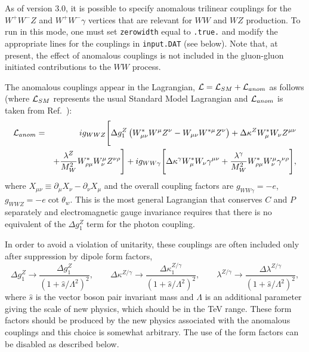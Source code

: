 \documentclass[12pt]{article}
\begin{document}
\label{sec:anomalous}
As of version 3.0, it is possible to specify anomalous trilinear
couplings for the $W^+W^-Z$ and $W^+W^-\gamma$ vertices that are
relevant for $WW$ and $WZ$ production. To run in this mode, one
must set {\tt zerowidth} equal to {\tt .true.}
and modify the appropriate lines for the couplings in {\tt input.DAT}
(see below). Note that, at present, the effect of anomalous couplings is not included
in the gluon-gluon initiated contributions to the $WW$ process.

The anomalous couplings appear in the Lagrangian,
${\cal L} = {\cal L}_{SM} + {\cal L}_{anom}$ as follows
(where ${\cal L}_{SM}$ represents the usual Standard Model Lagrangian and
${\cal L}_{anom}$ is taken from Ref.~\cite{Dixon:1999di}):
\begin{eqnarray}
{\cal L}_{anom} & = & i g_{WWZ} \Biggl[
 \Delta g_1^Z \left( W^*_{\mu\nu}W^\mu Z^\nu - W_{\mu\nu}W^{*\mu} Z^\nu \right)
+\Delta\kappa^Z W^*_\mu W_\nu Z^{\mu\nu} \nonumber \\
 & &+
 \frac{\lambda^Z}{M_W^2} W^*_{\rho\mu} W^\mu_\nu Z^{\nu\rho} \Biggr]
+i g_{WW\gamma} \Biggl[ 
 \Delta\kappa^\gamma W^*_\mu W_\nu \gamma^{\mu\nu}
+\frac{\lambda^\gamma}{M_W^2} W^*_{\rho\mu} W^\mu_\nu\gamma^{\nu\rho}
 \Biggr], \nonumber
\end{eqnarray}
where $X_{\mu\nu} \equiv \partial_\mu X_{\nu} - \partial_\nu X_{\mu}$
and the overall coupling factors are $g_{WW\gamma}=-e$,
$g_{WWZ}=-e\cot\theta_w$.
This is the most general Lagrangian that conserves $C$ and $P$
separately and electromagnetic gauge invariance requires that there
is no equivalent of the $\Delta g_1^Z$ term for the photon coupling.

In order to avoid a violation of unitarity, these couplings are often
included only after suppression by dipole form factors,
\begin{displaymath}
\Delta g_1^Z \rightarrow \frac{\Delta g_1^Z}{(1+\hat{s}/\Lambda^2)^2}, \qquad
\Delta \kappa^{Z/\gamma} \rightarrow
 \frac{\Delta \kappa_1^{Z/\gamma}}{(1+\hat{s}/\Lambda^2)^2}, \qquad
\lambda^{Z/\gamma} \rightarrow
 \frac{\Delta \lambda^{Z/\gamma}}{(1+\hat{s}/\Lambda^2)^2},
\end{displaymath}
where $\hat{s}$ is the vector boson pair invariant mass and $\Lambda$
is an additional parameter giving the scale of new physics, which should
be in the TeV range.
These form factors should be produced by the new physics associated with the
anomalous couplings and this choice is somewhat arbitrary. The use of the form
factors can be disabled as described below.
\end{document}
